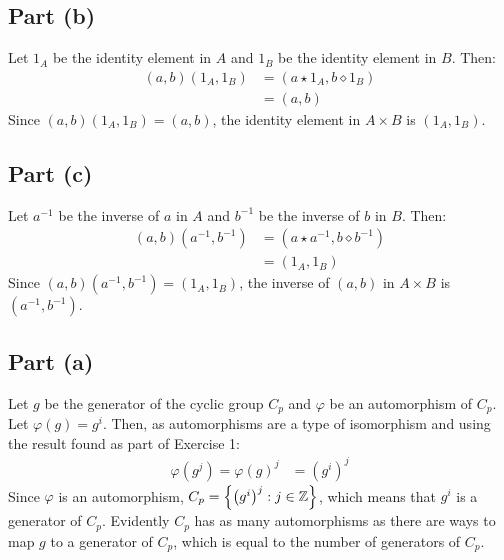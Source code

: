 \documentclass{article}
\begin{document}
\subsection*{Part (b)}
Let $1_A$ be the identity element in $A$ and $1_B$ be the identity element in $B$. Then:
\begin{equation}
    \begin{split}
        \left(a,b\right)\left(1_A,1_B\right) & = \left(a \star 1_A, b \diamond 1_B\right) \\
        & = \left(a, b\right)
    \end{split}
\end{equation}
Since $\left(a,b\right)\left(1_A,1_B\right) = \left(a, b\right)$, the identity element in $A \times B$ is $\left(1_A, 1_B\right)$. 
\subsection*{Part (c)}
Let $a^{-1}$ be the inverse of $a$ in $A$ and $b^{-1}$ be the inverse of $b$ in $B$. Then:
\begin{equation}
    \begin{split}
        \left(a,b\right)\left(a^{-1},b^{-1}\right) & = \left(a \star a^{-1}, b \diamond b^{-1}\right) \\
        & = \left(1_A, 1_B\right)
    \end{split}
\end{equation}
Since $\left(a,b\right)\left(a^{-1},b^{-1}\right) = \left(1_A, 1_B\right)$, the inverse of $\left(a, b\right)$ in $A \times B$ is $\left(a^{-1}, b^{-1}\right)$. 

\newpage

\problem
\subsection*{Part (a)}
Let $g$ be the generator of the cyclic group $C_p$ and $\varphi$ be an automorphism of $C_p$. Let $\varphi\left(g\right) = g^i$. Then, as automorphisms are a type of isomorphism and using the result found as part of Exercise 1:
\begin{equation}
    \begin{split}
        \varphi\left(g^j\right) = \varphi\left(g\right)^j & = \left(g^i\right)^j
    \end{split}
\end{equation}
Since $\varphi$ is an automorphism, $C_p = \left\{\left(g^i\right)^j : j \in \mathbb{Z} \right\}$, which means that $g^i$ is a generator of $C_p$. Evidently $C_p$ has as many automorphisms as there are ways to map $g$ to a generator of $C_p$, which is equal to the number of generators of $C_p$.
\end{document}
